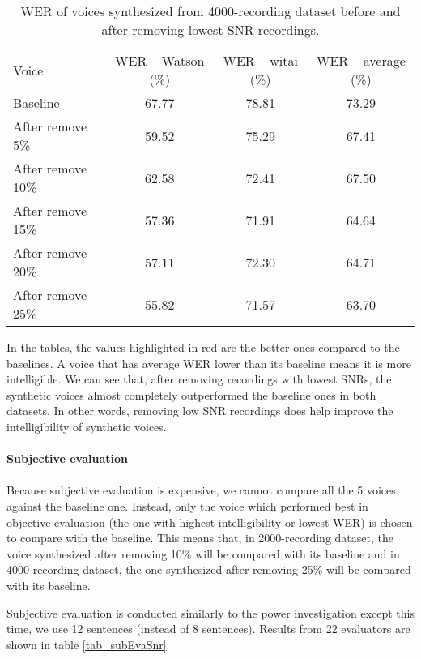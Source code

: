 \documentclass[12pt]{article}
\begin{document}
\begin{table}[]
\begin{center}
\caption{WER of voices synthesized from 4000-recording dataset before and after removing lowest SNR recordings.}
\label{tab_werSnr4000}
\vspace{3mm}
\begin{tabular}{lccc}
\hline
Voice & WER – Watson (\%) & WER – witai (\%) & WER – average (\%)\\
\cmidrule(l{0pt}r{2pt}){1-1}\cmidrule(l{0pt}r{2pt}){2-2}\cmidrule(l{0pt}r{2pt}){3-3}\cmidrule(l{0pt}r{2pt}){4-4}
Baseline          & 67.77 & 78.81 & 73.29 \\
After remove 5\%  & 59.52 & 75.29 & 67.41 \\
After remove 10\% & 62.58 & 72.41 & 67.50 \\
After remove 15\% & 57.36 & 71.91 & 64.64 \\
After remove 20\% & 57.11 & 72.30 & 64.71 \\
After remove 25\% & 55.82 & 71.57 & 63.70 \\
\hline
\end{tabular}
\end{center}
\end{table}

In the tables, the values highlighted in red are the better ones compared to the baselines. A voice that has average WER lower than its baseline means it is more intelligible. We can see that, after removing recordings with lowest SNRs, the synthetic voices almost completely outperformed the baseline ones in both datasets. In other words, removing low SNR recordings does help improve the intelligibility of synthetic voices.\\\\
\textbf{Subjective evaluation}\\\\
Because subjective evaluation is expensive, we cannot compare all the 5 voices against the baseline one. Instead, only the voice which performed best in objective evaluation (the one with highest intelligibility or lowest WER) is chosen to compare with the baseline. This means that, in 2000-recording dataset, the voice synthesized after removing 10\% will be compared with its baseline and in 4000-recording dataset, the one synthesized after removing 25\% will be compared with its baseline.

Subjective evaluation is conducted similarly to the power investigation except this time, we use 12 sentences (instead of 8 sentences). Results from 22 evaluators are shown in table \ref{tab_subEvaSnr}.
\end{document}

